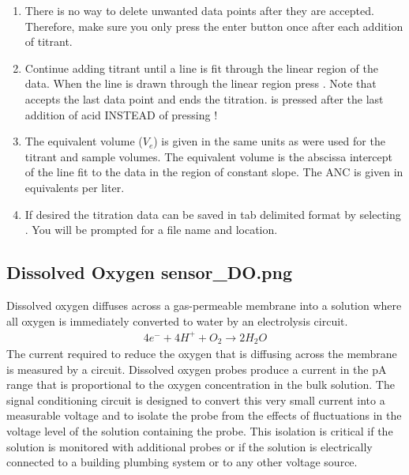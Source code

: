 \documentclass[letterpaper,10pt,english]{sphinxmanual}
\begin{document}
\begin{enumerate}
\item {} 
There is no way to delete unwanted data points after they are accepted. Therefore, make sure you only press the enter button once after each addition of titrant.

\item {} 
Continue adding titrant until a line is fit through the linear region of the data. When the line is drawn through the linear region press . Note that  accepts the last data point and ends the titration.  is pressed after the last addition of acid INSTEAD of pressing !

\item {} 
The equivalent volume (\(V_e\)) is given in the same units as were used for the titrant and sample volumes. The equivalent volume is the abscissa intercept of the line fit to the data in the region of constant slope. The ANC is given in equivalents per liter.

\item {} 
If desired the titration data can be saved in tab delimited format by selecting  . You will be prompted for a file name and location.

\end{enumerate}


\subsection[Dissolved Oxygen]{Dissolved Oxygen \lowercase{\sphinxincludegraphics}{{sensor_DO}.png}}
\label{\detokenize{ProCoDA/ProCoDA:dissolved-oxygen-sensor-do}}\label{\detokenize{ProCoDA/ProCoDA:heading-procoda-dissolved-oxygen}}
Dissolved oxygen diffuses across a gas-permeable membrane into a solution where all oxygen is immediately converted to water by an electrolysis circuit.
\begin{equation}\label{equation:ProCoDA/ProCoDA:ProCoDA/ProCoDA:0}
\begin{split}4e^- + 4H^+ + O_2 \to 2H_2O\end{split}
\end{equation}
The current required to reduce the oxygen that is diffusing across the membrane is measured by a circuit. Dissolved oxygen probes produce a current in the pA range that is proportional to the oxygen concentration in the bulk solution. The signal conditioning circuit is designed to convert this very small current into a measurable voltage and to isolate the probe from the effects of fluctuations in the voltage level of the solution containing the probe. This isolation is critical if the solution is monitored with additional probes or if the solution is electrically connected to a building plumbing system or to any other voltage source.
\end{document}
